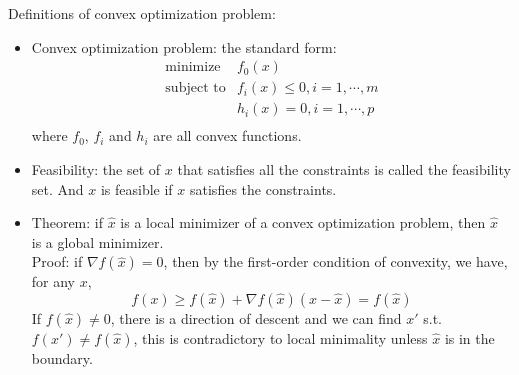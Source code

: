\documentclass{report}
\begin{document}
Definitions of convex optimization problem: 
\begin{itemize}
\item Convex optimization problem: the standard form: 
\begin{equation}
\begin{array}{ll}
\text{minimize} & f_0(x) \\
\text{subject to} & f_i(x) \leq 0, i = 1, \cdots, m\\
 & h_i(x) = 0, i = 1, \cdots, p\\
\end{array}
\end{equation}
where $f_0$, $f_i$ and $h_i$ are all convex functions. 

\item Feasibility: the set of $x$ that satisfies all the constraints is called the feasibility set. And $x$ is feasible if $x$ satisfies the constraints. 

\item Theorem: if $\hat{x}$ is a local minimizer of a convex optimization problem, then $\hat{x}$ is a global minimizer. \\
Proof: if $\nabla f(\hat{x}) = 0$, then by the first-order condition of convexity, we have, for any $x$, 
\begin{equation}
f(x) \geq f(\hat{x}) + \nabla f(\hat{x}) (x - \hat{x}) = f(\hat{x})
\end{equation}
If $f(\hat{x}) \neq 0$, there is a direction of descent and we can find $x'$ s.t. $f(x') \neq f(\hat{x})$, this is contradictory to local minimality unless $\hat{x}$ is in the boundary. 
\end{itemize}
\end{document}
